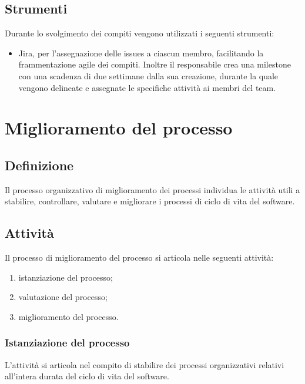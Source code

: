 \subsection{Strumenti}
Durante lo svolgimento dei compiti vengono utilizzati i seguenti strumenti:
\begin{itemize}
    \item Jira, per l'assegnazione delle issues a ciascun membro, facilitando la frammentazione agile dei compiti. Inoltre il responsabile crea una milestone con una scadenza di due settimane dalla sua creazione, durante la quale vengono delineate e assegnate le specifiche attività ai membri del team.
\end{itemize}

\newpage

\section{Miglioramento del processo} \label{sec:migliproc}
\subsection{Definizione}
Il processo organizzativo di miglioramento dei processi individua le attività utili a stabilire, controllare, valutare e migliorare i processi di ciclo di vita del software.
\subsection{Attività}
Il processo di miglioramento del processo si articola nelle seguenti attività:
\begin{enumerate}
    \item istanziazione del processo;
    \item valutazione del processo;
    \item miglioramento del processo.
\end{enumerate}
\subsubsection{Istanziazione del processo}
L'attività si articola nel compito di stabilire dei processi organizzativi relativi all'intera durata del ciclo di vita del software.
